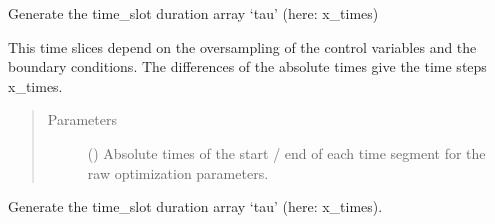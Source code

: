\documentclass[letterpaper,10pt,english]{sphinxmanual}
\begin{document}
\begin{fulllineitems}
\begin{fulllineitems}
\begin{quote}
\begin{description}
\end{description}\end{quote}

\end{fulllineitems}


\begin{fulllineitems}
\label{\detokenize{qsim:qsim.transfer_function.TransferFunction.set_absolute_times}}
Generate the time\_slot duration array ‘tau’ (here: x\_times)

This time slices depend on the oversampling of the control variables
and the boundary conditions. The differences of the absolute times
give the time steps x\_times.
\begin{quote}\begin{description}
\item[{Parameters}] \leavevmode
{} (\sphinxstyleliteralemphasis{\sphinxupquote{{[}}}\sphinxstyleliteralemphasis{\sphinxupquote{, }}\sphinxstyleliteralemphasis{\sphinxupquote{{]}}}) \textendash{} Absolute times of the start / end of each time segment for the raw
optimization parameters.

\end{description}\end{quote}

\end{fulllineitems}


\begin{fulllineitems}
\label{\detokenize{qsim:qsim.transfer_function.TransferFunction.set_times}}
Generate the time\_slot duration array ‘tau’ (here: x\_times).


\end{fulllineitems}
\end{fulllineitems}
\end{document}
